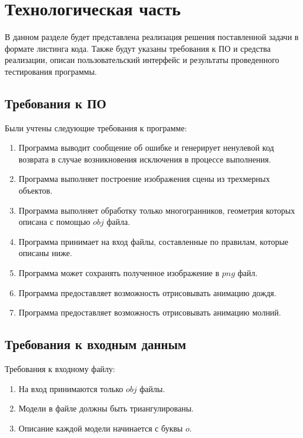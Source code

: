 \chapter{Технологическая часть}

В данном разделе будет представлена реализация решения поставленной задачи в формате листинга кода. Также будут указаны требования к ПО и средства реализации, описан пользовательский интерфейс и
результаты проведенного тестирования программы.

\section{Требования к ПО}

Были учтены следующие требования к программе:
\begin{enumerate}[label=\arabic*)]
    \item Программа выводит сообщение об ошибке и генерирует ненулевой код
возврата в случае возникновения исключения в процессе выполнения.
    \item Программа выполняет построение изображения сцены из трехмерных
объектов.
    \item Программа выполняет обработку только многогранников, геометрия
которых описана с помощью $obj$ файла.
    \item Программа принимает на вход файлы, составленные по правилам, которые описаны ниже.
    \item Программа может сохранять полученное изображение в $png$ файл.
    \item Программа предоставляет возможность отрисовывать анимацию дождя.
    \item Программа предоставляет возможность отрисовывать анимацию молний.
    
\end{enumerate} 

\section{Требования к входным данным}
Требования к входному файлу:
\begin{enumerate}[label=\arabic*)]
\item На вход принимаются только $obj$ файлы.
\item Модели в файле должны быть триангулированы.
\item Описание каждой модели начинается с буквы $o$.
\end{enumerate} 

